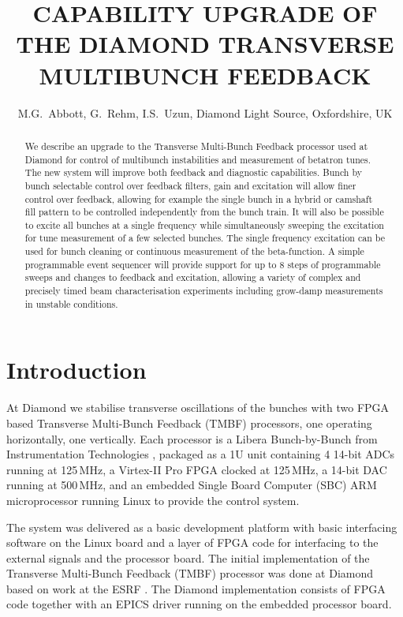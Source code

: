 \documentclass{JAC2003}
\begin{document}
\title{CAPABILITY UPGRADE OF THE DIAMOND TRANSVERSE MULTIBUNCH FEEDBACK}

\author{%
    M.G.~Abbott, G.~Rehm, I.S.~Uzun,
    Diamond Light Source, Oxfordshire, UK}

\maketitle

\begin{abstract}

We describe an upgrade to the Transverse Multi-Bunch Feedback processor used
at Diamond for control of multibunch instabilities and measurement of betatron
tunes.  The new system will improve both feedback and diagnostic capabilities.
Bunch by bunch selectable control over feedback filters, gain and excitation
will allow finer control over feedback, allowing for example the single bunch
in a hybrid or camshaft fill pattern to be controlled independently from the
bunch train.  It will also be possible to excite all bunches at a single
frequency while simultaneously sweeping the excitation for tune measurement of
a few selected bunches.  The single frequency excitation can be used for bunch
cleaning or continuous measurement of the beta-function.  A simple
programmable event sequencer will provide support for up to 8 steps of
programmable sweeps and changes to feedback and excitation, allowing a variety
of complex and precisely timed beam characterisation experiments including
grow-damp measurements in unstable conditions.

\end{abstract}


\section{Introduction}

At Diamond we stabilise transverse oscillations of the bunches with two FPGA
based Transverse Multi-Bunch Feedback (TMBF) processors, one operating
horizontally, one vertically.  Each processor is a Libera Bunch-by-Bunch from
Instrumentation Technologies \cite{libera}, packaged as a 1U unit containing 4
14-bit ADCs running at 125\,MHz, a Virtex-II Pro FPGA clocked at 125\,MHz, a
14-bit DAC running at 500\,MHz, and an embedded Single Board Computer (SBC) ARM
microprocessor running Linux to provide the control system.

The system was delivered as a basic development platform with basic interfacing
software on the Linux board and a layer of FPGA code for interfacing to the
external signals and the processor board.  The initial implementation of the
Transverse Multi-Bunch Feedback (TMBF) processor was done at Diamond
\cite{early-tmbf} based on work at the ESRF \cite{esrf}.  The Diamond
implementation consists of FPGA code together with an EPICS driver running on
the embedded processor board.
\end{document}
